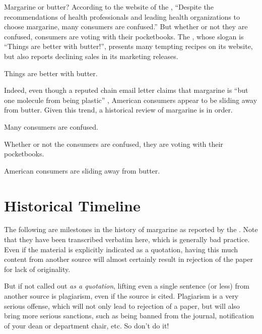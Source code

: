 \documentclass[mnsc,blindrev]{informs3} %
\begin{document}
Margarine or butter? According to the website of the 
\cite{namm}, ``Despite the
recommendations of health professionals and leading health
organizations to choose margarine, many consumers are confused.''
But whether or not they are confused, consumers are voting with
their pocketbooks.  The 
\cite{abi}, whose
slogan is ``Things are better with butter!'', presents many tempting
recipes on its website, but also reports declining sales in its
marketing releases.  

\begin{hypothesis}
Things are better with butter.
\end{hypothesis}

Indeed, even though a reputed chain email letter claims that margarine is ``but 
one molecule from being plastic'' 
\citep{btc}, 
American consumers appear to be
sliding away from butter. Given this trend, a historical review of
margarine is in order.


\begin{lemma}
Many consumers are confused.
\end{lemma}

\begin{lemma}
Whether or not the consumers are confused, they are voting with
their pocketbooks.
\end{lemma}

\begin{proposition}
American consumers are sliding away from butter.
\end{proposition}


\section{Historical Timeline}

The following are milestones in the history of margarine as
reported by the 
\cite{namm2}.  
Note that they have been transcribed verbatim here, which
is generally bad practice.  Even if the material is explicitly
indicated as a quotation, having this much content from another
source will almost certainly result in rejection of the paper for
lack of originality.

But if not called out {\em as a quotation}, lifting even a single
sentence (or less) from another source is plagiarism, even if the
source is cited.  Plagiarism is a very serious offense, which will
not only lead to rejection of a paper, but will also bring more
serious sanctions, such as being banned from the journal,
notification of your dean or department chair, etc.  So don't do it!
\end{document}

